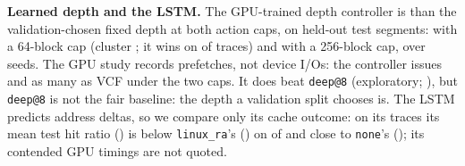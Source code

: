 \textbf{Learned depth and the LSTM.} The GPU-trained depth controller is
\decDiskLearnedDepthVsVcfCapTwoHundredFiftySixVerdict{} than the
validation-chosen fixed depth at both action caps, on held-out test segments:
\decDiskLearnedDepthVsVcfCapSixtyFourPairedCI{} with a 64-block cap (cluster
\decDiskLearnedDepthVsVcfCapSixtyFourClusterCI; it wins on
\ldVsVcfCapSixtyFourWins{} of \ldVsVcfCapSixtyFourN{} traces) and
\decDiskLearnedDepthVsVcfCapTwoHundredFiftySixPairedCI{} with a 256-block cap,
over \ldSeedsCapTwoHundredFiftySix{} seeds. The GPU study records prefetches,
not device I/Os: the controller issues \ldIssuedVsVcfCapSixtyFour{} and
\ldIssuedVsVcfCapTwoHundredFiftySix{} as many as VCF under the two caps. It does beat \texttt{deep@8}
(exploratory; \ldVsDeepEightCapTwoHundredFiftySixCI), but \texttt{deep@8} is not the fair
baseline: the depth a validation split chooses is. The LSTM predicts address deltas, so we compare only its
cache outcome: on its \lstmTraces{} traces its mean test hit ratio
(\lstmMeanHit) is below \texttt{linux\_ra}'s (\lstmMeanLinuxRaHit) on
\lstmBelowLinuxRa{} of \lstmTraces{} and close to \texttt{none}'s
(\lstmMeanNoneHit); its contended GPU timings are not quoted.
